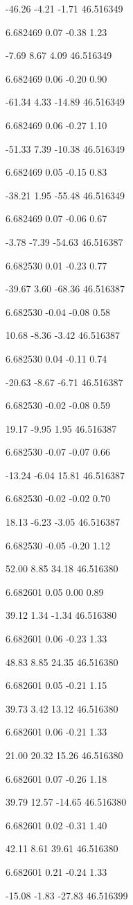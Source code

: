 -46.26
-4.21
-1.71
46.516349

6.682469
0.07
-0.38
1.23

-7.69
8.67
4.09
46.516349

6.682469
0.06
-0.20
0.90

-61.34
4.33
-14.89
46.516349

6.682469
0.06
-0.27
1.10

-51.33
7.39
-10.38
46.516349

6.682469
0.05
-0.15
0.83

-38.21
1.95
-55.48
46.516349

6.682469
0.07
-0.06
0.67

-3.78
-7.39
-54.63
46.516387

6.682530
0.01
-0.23
0.77

-39.67
3.60
-68.36
46.516387

6.682530
-0.04
-0.08
0.58

10.68
-8.36
-3.42
46.516387

6.682530
0.04
-0.11
0.74

-20.63
-8.67
-6.71
46.516387

6.682530
-0.02
-0.08
0.59

19.17
-9.95
1.95
46.516387

6.682530
-0.07
-0.07
0.66

-13.24
-6.04
15.81
46.516387

6.682530
-0.02
-0.02
0.70

18.13
-6.23
-3.05
46.516387

6.682530
-0.05
-0.20
1.12

52.00
8.85
34.18
46.516380

6.682601
0.05
0.00
0.89

39.12
1.34
-1.34
46.516380

6.682601
0.06
-0.23
1.33

48.83
8.85
24.35
46.516380

6.682601
0.05
-0.21
1.15

39.73
3.42
13.12
46.516380

6.682601
0.06
-0.21
1.33

21.00
20.32
15.26
46.516380

6.682601
0.07
-0.26
1.18

39.79
12.57
-14.65
46.516380

6.682601
0.02
-0.31
1.40

42.11
8.61
39.61
46.516380

6.682601
0.21
-0.24
1.33

-15.08
-1.83
-27.83
46.516399

